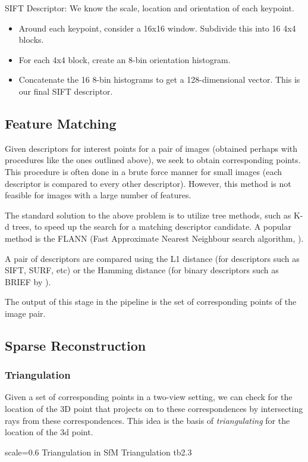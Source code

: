 SIFT Descriptor: We know the scale, location and orientation of each keypoint. 
\begin{itemize}
	\item Around each keypoint, consider a 16x16 window. Subdivide this into 16 4x4 blocks.
	\item For each 4x4 block, create an 8-bin orientation histogram. 
	\item Concatenate the 16 8-bin histograms to get a 128-dimensional vector. This is our final SIFT descriptor. 
\end{itemize}

\subsection{Feature Matching}
Given descriptors for interest points for a pair of images (obtained perhaps with procedures like the ones outlined above), we seek to obtain corresponding points. This procedure is often done in a brute force manner for small images (each descriptor is compared to every other descriptor). However, this method is not feasible for images with a large number of features.

The standard solution to the above problem is to utilize tree methods, such as K-d trees, to speed up the search for a matching descriptor candidate. A popular method is the FLANN (Fast Approximate Nearest Neighbour search algorithm, \cite{Lowe2014}).

A pair of descriptors are compared using the L1 distance (for descriptors such as SIFT, SURF, etc) or the Hamming distance (for binary descriptors such as BRIEF by \cite{Lepetit2010}).

The output of this stage in the pipeline is the set of corresponding points of the image pair. 

\subsection{Sparse Reconstruction}
\subsubsection{Triangulation}
Given a set of corresponding points in a two-view setting, we can check for the location of the 3D point that projects on to these correspondences by intersecting rays from these correspondences. This idea is the basis of \emph{triangulating} for the location of the 3d point.

{scale=0.6}%
{Triangulation in SfM}%
{Triangulation}%
{tb2.3}


